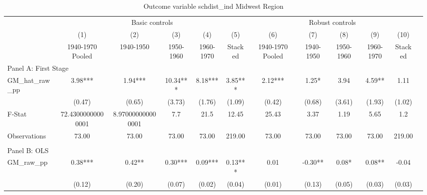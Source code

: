  \begin{table}[htbp]\centering {} \begin{threeparttable} \caption{Outcome variable schdist\_ind Midwest Region} \begin{tabular}{l*{11}{c}} \toprule
          &\multicolumn{5}{c}{Basic controls}                                   &\multicolumn{5}{c}{Robust controls}                                  \\\cmidrule(lr){2-6}\cmidrule(lr){7-11}
          &\multicolumn{1}{c}{(1)}&\multicolumn{1}{c}{(2)}&\multicolumn{1}{c}{(3)}&\multicolumn{1}{c}{(4)}&\multicolumn{1}{c}{(5)}&\multicolumn{1}{c}{(6)}&\multicolumn{1}{c}{(7)}&\multicolumn{1}{c}{(8)}&\multicolumn{1}{c}{(9)}&\multicolumn{1}{c}{(10)}\\
          &\multicolumn{1}{c}{1940-1970 Pooled}&\multicolumn{1}{c}{1940-1950}&\multicolumn{1}{c}{1950-1960}&\multicolumn{1}{c}{1960-1970}&\multicolumn{1}{c}{Stacked}&\multicolumn{1}{c}{1940-1970 Pooled}&\multicolumn{1}{c}{1940-1950}&\multicolumn{1}{c}{1950-1960}&\multicolumn{1}{c}{1960-1970}&\multicolumn{1}{c}{Stacked}\\
\cmidrule(lr){1-11}
\multicolumn{10}{l}{Panel A: First Stage}\\
\cmidrule(lr){1-11}
GM\_hat\_raw\_pp&      3.98***&      1.94***&     10.34***&      8.18***&      3.85***&      2.12***&      1.25*  &      3.94   &      4.59** &      1.11   \\
          &    (0.47)   &    (0.65)   &    (3.73)   &    (1.76)   &    (1.09)   &    (0.42)   &    (0.68)   &    (3.61)   &    (1.93)   &    (1.02)   \\
\midrule
F-Stat    &72.43000000000001   &8.970000000000001   &       7.7   &      21.5   &     12.45   &     25.43   &      3.37   &      1.19   &      5.65   &       1.2   \\
Observations&     73.00   &     73.00   &     73.00   &     73.00   &    219.00   &     73.00   &     73.00   &     73.00   &     73.00   &    219.00   \\
\cmidrule[\heavyrulewidth](lr){1-11} \\ \cmidrule[\heavyrulewidth](lr){1-11}
\multicolumn{10}{l}{Panel B: OLS}\\
\cmidrule(lr){1-11}
GM\_raw\_pp &      0.38***&      0.42** &      0.30***&      0.09***&      0.13***&      0.01   &     -0.30** &      0.08*  &      0.08** &     -0.04   \\
          &    (0.12)   &    (0.20)   &    (0.07)   &    (0.02)   &    (0.04)   &    (0.01)   &    (0.13)   &    (0.05)   &    (0.03)   &    (0.03)   \\

\end{tabular}
\end{threeparttable}
\end{table}
